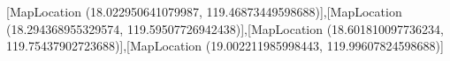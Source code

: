 [MapLocation (18.022950641079987, 119.46873449598688)],[MapLocation (18.294368955329574, 119.59507726942438)],[MapLocation (18.601810097736234, 119.75437902723688)],[MapLocation (19.002211985998443, 119.99607824598688)]